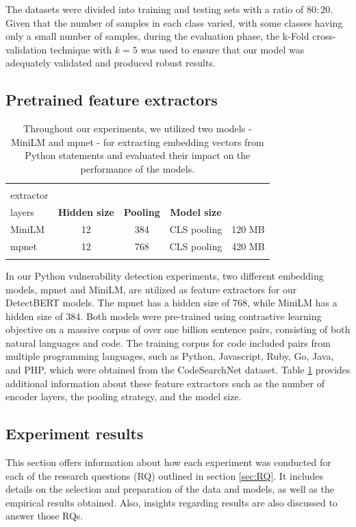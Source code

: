 \documentclass{ieeeaccess}
\begin{document}
\par The datasets were divided into training and testing sets with a ratio of $80:20$. Given that the number of samples in each class varied, with some classes having only a small number of samples, during the evaluation phase, the k-Fold cross-validation technique with $k=5$  was used to ensure that our model was adequately validated and produced robust results.



\subsection{Pretrained feature extractors}\label{sec:feature_extractors}
\begin{table}[h]
\centering
\begin{tabular}{lcccc}
\Xhline{2\arrayrulewidth}
\textbf{\makecell{Feature\\ extractor}} & \textbf{\makecell{Num\\ layers}} & \textbf{Hidden size} &  \textbf{Pooling} & \textbf{Model size} \\
 \hline
 MiniLM\cite{minilm} &  12  & 384 &  CLS pooling & 120 MB\\
 mpnet\cite{mpnet} & 12 & 768 &  CLS pooling & 420 MB\\
\Xhline{2\arrayrulewidth}
\end{tabular}
\caption{Throughout our experiments, we utilized two models - MiniLM and mpnet - for extracting embedding vectors from Python statements and evaluated their impact on the performance of the models. }
\label{table:Embedding}
\end{table}
In our Python vulnerability detection experiments, two different embedding models, mpnet and MiniLM, are  utilized as feature extractors for our DetectBERT models. The mpnet has a hidden size of 768, while MiniLM has a hidden size of 384. Both models were pre-trained using contrastive learning objective \cite{sbert} on a massive corpus of over one billion sentence pairs, consisting of both natural languages and code. The training corpus for code included pairs from multiple programming languages, such as Python, Javascript, Ruby, Go, Java, and PHP, which were obtained from the CodeSearchNet dataset\cite{husain_codesearchnet_2019}. Table \ref{table:Embedding} provides additional information about these feature extractors such as the number of encoder layers, the pooling strategy, and the model size.
\subsection{Experiment results}
This section offers  information about how each experiment was conducted for each of the research questions (RQ) outlined in section \ref{sec:RQ}. It includes details on the selection and preparation of the data and models, as well as the empirical results obtained.  Also, insights regarding  results are also discussed to answer those RQs. 
\end{document}

